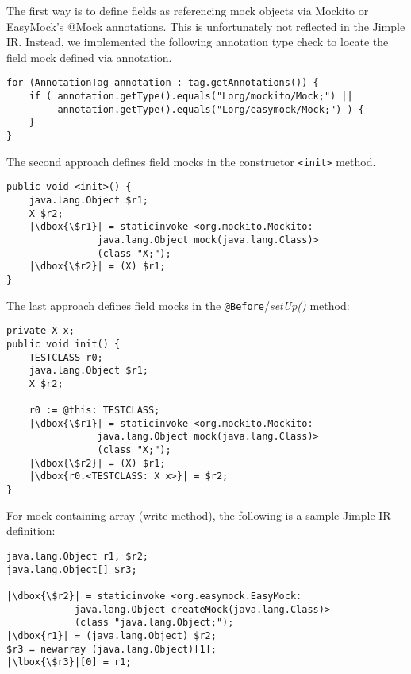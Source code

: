 The first way is to define fields as referencing mock objects via Mockito or EasyMock's @Mock annotations. This is unfortunately not reflected in the Jimple IR. Instead, we implemented the following annotation type check to locate the field mock defined via annotation.

\begin{lstlisting}[basicstyle=\linespread{1.0}\ttfamily\small,numbers=none,escapechar={|}]
for (AnnotationTag annotation : tag.getAnnotations()) {
	if ( annotation.getType().equals("Lorg/mockito/Mock;") ||
		 annotation.getType().equals("Lorg/easymock/Mock;") ) {
	}
}
\end{lstlisting}

The second approach defines field mocks in the constructor \texttt{<init>} method.

\begin{lstlisting}[basicstyle=\linespread{1.0}\ttfamily\small,numbers=none,escapechar={|}]
public void <init>() {
	java.lang.Object $r1;
	X $r2;
	|\dbox{\$r1}| = staticinvoke <org.mockito.Mockito:
				java.lang.Object mock(java.lang.Class)>
				(class "X;");
	|\dbox{\$r2}| = (X) $r1;
}
\end{lstlisting}

The last approach defines field mocks in the \texttt{@Before}/\textit{setUp()} method:

\begin{lstlisting}[basicstyle=\linespread{1.0}\ttfamily\small,numbers=none,escapechar={|}]
private X x;
public void init() {
	TESTCLASS r0;
	java.lang.Object $r1;
	X $r2;
	
	r0 := @this: TESTCLASS;
	|\dbox{\$r1}| = staticinvoke <org.mockito.Mockito:
				java.lang.Object mock(java.lang.Class)>
				(class "X;");
	|\dbox{\$r2}| = (X) $r1;
	|\dbox{r0.<TESTCLASS: X x>}| = $r2;
}
\end{lstlisting}

For mock-containing array (write method), the following is a sample Jimple IR definition:

\begin{lstlisting}[basicstyle=\linespread{1.0}\ttfamily\small,numbers=none,escapechar={|}]
java.lang.Object r1, $r2;
java.lang.Object[] $r3;

|\dbox{\$r2}| = staticinvoke <org.easymock.EasyMock:
			java.lang.Object createMock(java.lang.Class)>
			(class "java.lang.Object;");
|\dbox{r1}| = (java.lang.Object) $r2;
$r3 = newarray (java.lang.Object)[1];
|\lbox{\$r3}|[0] = r1;
\end{lstlisting}

